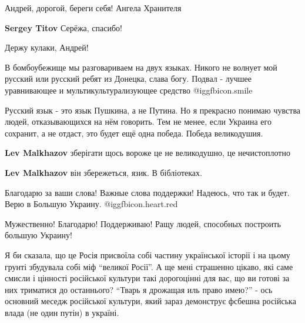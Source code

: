 
 
 
 
 
\zzSecCmt

\begin{itemize} %
Андрей, дорогой, береги себя! Ангела Хранителя

\textbf{Sergey Titov} Серёжа, спасибо!

Держу кулаки, Андрей!


В бомбоубежище мы разговариваем на двух языках. Никого не волнует мой русский
или русский ребят из Донецка, слава богу. Подвал - лучшее уравнивающее и
мультикультурализующее средство  @igg{fbicon.smile} 


Русский язык - это язык Пушкина, а не Путина. Но я прекрасно понимаю чувства
людей, отказывающихся на нём говорить. Тем не менее, если Украина его сохранит,
а не отдаст, это будет ещё одна победа. Победа великодушия.

\begin{itemize} %
\textbf{Lev Malkhazov} зберігати щось вороже це не великодушно, це нечистоплотно

\textbf{Lev Malkhazov} він збережеться, язик. В бібліотеках.
\end{itemize} %


Благодарю за ваши слова! Важные слова поддержки! Надеюсь, что так и будет. Верю
в Большую Украину. @igg{fbicon.heart.red}

Мужественно! Благодарю!
Поддерживаю!
Ращу людей, способных построить большую Украину!


Я би сказала, що це Росія присвоїла собі частину української історії і на цьому
грунті збудувала собі міф \enquote{великої Росії}. А ще мені страшенно цікаво, які саме
смисли і цінності російської культури такі дорогоцінні для вас, що ви готові за
них триматися до останнього? \enquote{Тварь я дрожащая иль право имею?} - ось основний
меседж російської культури, який зараз демонструє фсбешна російська влада (не
один путін) в україні.


\end{itemize}
